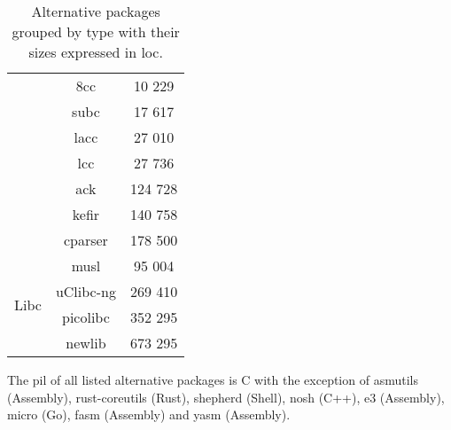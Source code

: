 \begin{table}[!ht]
\begin{tabular}{|c|c|c|}
        \cline{2-3}
        & 8cc \cite{8cc} & 10 229 \\
        \cline{2-3}
        & subc \cite{subc} & 17 617 \\
        \cline{2-3}
        & lacc \cite{lacc} & 27 010 \\
        \cline{2-3}
        & lcc \cite{lcc} \footnotemark[4] & 27 736 \\
        \cline{2-3}
        & ack \cite{ack} & 124 728 \\
        \cline{2-3}
        & kefir \cite{kefir} & 140 758 \\
        \cline{2-3}
        & cparser \cite{cparser} & 178 500 \\
        \hline
        \hline
        \multirow{4}{*}{Libc}
        & musl \cite{musl} & 95 004 \\
        \cline{2-3}
        & uClibc-ng \cite{uclibc-ng} & 269 410 \\
        \cline{2-3}
        & picolibc \cite{picolibc} & 352 295\\
        \cline{2-3}
        & newlib \cite{newlib} & 673 295\\
        \hline
    \end{tabular}
    \caption{Alternative packages grouped by type with their sizes expressed in \gls{loc}.}
    \label{table:Alternative packages}
\end{table}


The \gls{pil} of all listed alternative packages is C with the exception of asmutils (Assembly), rust-coreutils (Rust), shepherd (Shell), nosh (C++), e3 (Assembly), micro (Go), fasm (Assembly) and yasm (Assembly).

